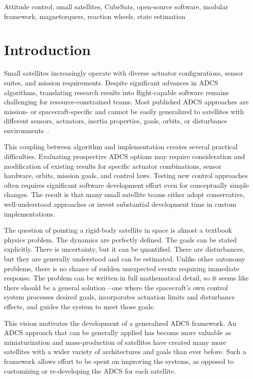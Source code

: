\documentclass[conference]{IEEEtran}
\begin{document}
\begin{IEEEkeywords}
Attitude control, small satellites, CubeSats, open-source software, modular framework, magnetorquers, reaction wheels, state estimation
\end{IEEEkeywords}

\section{Introduction}\label{sec:introduction}

Small satellites increasingly operate with diverse actuator configurations, sensor suites, and mission requirements. Despite significant advances in ADCS algorithms, translating research results into flight-capable software remains challenging for resource-constrained teams. Most published ADCS approaches are mission- or spacecraft-specific and cannot be easily generalized to satellites with different sensors, actuators, inertia properties, goals, orbits, or disturbance environments~\cite{wertz1978spacecraft,wie2008spacecraft}.

This coupling between algorithm and implementation creates several practical difficulties. Evaluating prospective ADCS options may require consideration and modification of existing results for specific actuator combinations, sensor hardware, orbits, mission goals, and control laws. Testing new control approaches often requires significant software development effort even for conceptually simple changes. The result is that many small satellite teams either adopt conservative, well-understood approaches or invest substantial development time in custom implementations.

The question of pointing a rigid-body satellite in space is almost a textbook physics problem. The dynamics are perfectly defined. The goals can be stated explicitly. There is uncertainty, but it can be quantified. There are disturbances, but they are generally understood and can be estimated. Unlike other autonomy problems, there is no chance of sudden unexpected events requiring immediate response. The problem can be written in full mathematical detail, so it seems like there should be a general solution---one where the spacecraft's own control system processes desired goals, incorporates actuation limits and disturbance effects, and guides the system to meet those goals.

This vision motivates the development of a generalized ADCS framework. An ADCS approach that can be generally applied has become more valuable as miniaturization and mass-production of satellites have created many more satellites with a wider variety of architectures and goals than ever before. Such a framework allows effort to be spent on improving the systems, as opposed to customizing or re-developing the ADCS for each satellite.
\end{document}
